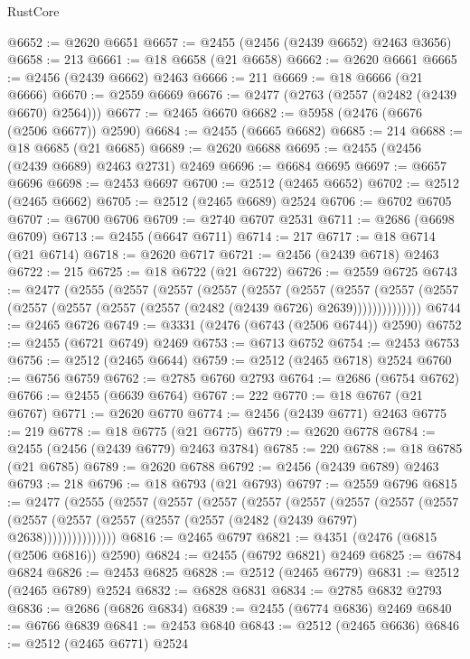 \begin{lexlean}{RustCore}
\begin{coremodule}
@6652 := @2620 @6651
@6657 := @2455 (@2456 (@2439 @6652) @2463 @3656)
@6658 := 213
@6661 := @18 @6658 (@21 @6658)
@6662 := @2620 @6661
@6665 := @2456 (@2439 @6662) @2463
@6666 := 211
@6669 := @18 @6666 (@21 @6666)
@6670 := @2559 @6669
@6676 := @2477 (@2763 (@2557 (@2482 (@2439 @6670) @2564)))
@6677 := @2465 @6670
@6682 := @5958 (@2476 (@6676 (@2506 @6677)) @2590)
@6684 := @2455 (@6665 @6682)
@6685 := 214
@6688 := @18 @6685 (@21 @6685)
@6689 := @2620 @6688
@6695 := @2455 (@2456 (@2439 @6689) @2463 @2731) @2469
@6696 := @6684 @6695
@6697 := @6657 @6696
@6698 := @2453 @6697
@6700 := @2512 (@2465 @6652)
@6702 := @2512 (@2465 @6662)
@6705 := @2512 (@2465 @6689) @2524
@6706 := @6702 @6705
@6707 := @6700 @6706
@6709 := @2740 @6707 @2531
@6711 := @2686 (@6698 @6709)
@6713 := @2455 (@6647 @6711)
@6714 := 217
@6717 := @18 @6714 (@21 @6714)
@6718 := @2620 @6717
@6721 := @2456 (@2439 @6718) @2463
@6722 := 215
@6725 := @18 @6722 (@21 @6722)
@6726 := @2559 @6725
@6743 := @2477
    (@2555
      (@2557
        (@2557
          (@2557
            (@2557
              (@2557
                (@2557
                  (@2557 (@2557 (@2557 (@2557 (@2557 (@2557 (@2482 (@2439 @6726) @2639))))))))))))))
@6744 := @2465 @6726
@6749 := @3331 (@2476 (@6743 (@2506 @6744)) @2590)
@6752 := @2455 (@6721 @6749) @2469
@6753 := @6713 @6752
@6754 := @2453 @6753
@6756 := @2512 (@2465 @6644)
@6759 := @2512 (@2465 @6718) @2524
@6760 := @6756 @6759
@6762 := @2785 @6760 @2793
@6764 := @2686 (@6754 @6762)
@6766 := @2455 (@6639 @6764)
@6767 := 222
@6770 := @18 @6767 (@21 @6767)
@6771 := @2620 @6770
@6774 := @2456 (@2439 @6771) @2463
@6775 := 219
@6778 := @18 @6775 (@21 @6775)
@6779 := @2620 @6778
@6784 := @2455 (@2456 (@2439 @6779) @2463 @3784)
@6785 := 220
@6788 := @18 @6785 (@21 @6785)
@6789 := @2620 @6788
@6792 := @2456 (@2439 @6789) @2463
@6793 := 218
@6796 := @18 @6793 (@21 @6793)
@6797 := @2559 @6796
@6815 := @2477
    (@2555
      (@2557
        (@2557
          (@2557
            (@2557
              (@2557
                (@2557
                  (@2557
                    (@2557
                      (@2557 (@2557 (@2557 (@2557 (@2557 (@2482 (@2439 @6797) @2638)))))))))))))))
@6816 := @2465 @6797
@6821 := @4351 (@2476 (@6815 (@2506 @6816)) @2590)
@6824 := @2455 (@6792 @6821) @2469
@6825 := @6784 @6824
@6826 := @2453 @6825
@6828 := @2512 (@2465 @6779)
@6831 := @2512 (@2465 @6789) @2524
@6832 := @6828 @6831
@6834 := @2785 @6832 @2793
@6836 := @2686 (@6826 @6834)
@6839 := @2455 (@6774 @6836) @2469
@6840 := @6766 @6839
@6841 := @2453 @6840
@6843 := @2512 (@2465 @6636)
@6846 := @2512 (@2465 @6771) @2524

\end{coremodule}
\end{lexlean}
